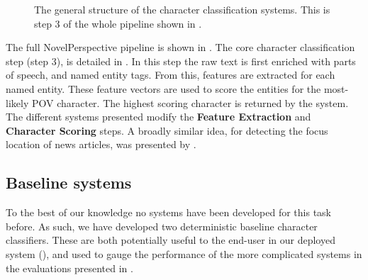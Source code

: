 \documentclass[11pt,a4paper]{article}
\newcommand{\textcite}{\cite}
\begin{document}
\begin{figure*}
	\caption{The general structure of the character classification systems. This is step 3 of the whole pipeline shown in . \label{fig:classify}}
\end{figure*}

The full NovelPerspective pipeline is shown in .
The core character classification step (step 3), is detailed in .
In this step the raw text is first enriched with parts of speech, and named entity tags.
From this, features are extracted for each named entity.
These feature vectors are used to score the entities for the most-likely POV character.
The highest scoring character is returned by the system.
The different systems presented modify the \textbf{Feature Extraction} and \textbf{Character Scoring} steps.
A broadly similar idea, for detecting the focus location of news articles, was presented by \textcite{2017focus}.


\subsection{Baseline systems}
To the best of our knowledge no systems have been developed for this task before.
As such, we have developed two deterministic baseline character classifiers.
These are both potentially useful to the end-user in our deployed system (), and used to gauge the performance of the more complicated systems in the evaluations presented in .
\end{document}
